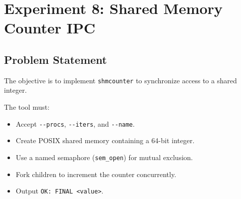 
\section{Experiment 8: Shared Memory Counter IPC}

\subsection{Problem Statement}
The objective is to implement \texttt{shmcounter} to synchronize access to a shared integer.

The tool must:
\begin{itemize}
    \item Accept \verb|--procs|, \verb|--iters|, and \verb|--name|.
    \item Create POSIX shared memory containing a 64-bit integer.
    \item Use a named semaphore (\verb|sem_open|) for mutual exclusion.
    \item Fork children to increment the counter concurrently.
    \item Output \verb|OK: FINAL <value>|.
\end{itemize}

